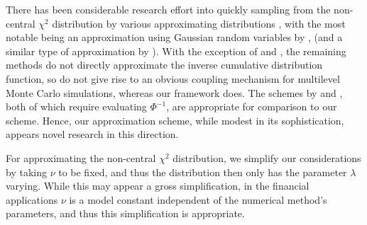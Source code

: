 \documentclass[manuscript,review]{acmart}
\begin{document}
There has been considerable research effort into quickly sampling from the non-central $ \chi^2 $ distribution by various approximating distributions \citep{johnson1995continuous,sankaran1959non,abdel1954approximate,wilson1931distribution,hoaglin1977direct,shea1991algorithm,best1975algorithm,rice1968uniform}, with the most notable being an approximation using Gaussian random variables by \citet{abdel1954approximate}, (and a similar type of approximation by \citet{sankaran1959non}). With the exception of \citet{abdel1954approximate} and \citet{sankaran1959non}, the remaining methods do not directly approximate the inverse cumulative distribution function, so do not give rise to an obvious coupling mechanism for multilevel Monte Carlo simulations, whereas our framework does. The schemes by \citet{abdel1954approximate} and \citet{sankaran1959non}, both of which require evaluating $ \Phi^{-1} $, are appropriate for comparison to our scheme. Hence, our approximation scheme, while modest in its sophistication, appears novel research in this direction.

For approximating the non-central $ \chi^2 $ distribution, we simplify our considerations by taking $ \nu $ to be fixed, and thus the distribution then only has the parameter $ \lambda $ varying. While this may appear a gross simplification, in the financial applications $ \nu $ is a model constant independent of the numerical method's parameters, and thus this simplification is appropriate.
\end{document}
